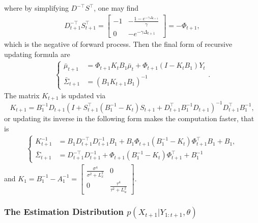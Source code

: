 where by simplifying $D^{-\top}S^\top$, one may find 
\begin{align*}
D_{t+1}^{-\top}S_{t+1}^\top = \begin{bmatrix}
-1 & -\frac{1-e^{-\gamma \Delta_{t+1}}}{\gamma} \\ 0 & - e^{-\gamma \Delta_{t+1}}
\end{bmatrix} = -\Phi_{t+1},
\end{align*}
which is the negative of forward process. Then the final form of recursive updating formula are 
\begin{align}
\begin{cases}
\bar{\mu}_{t+1}&=\Phi_{t+1} K_tB_1\bar{\mu}_t + \Phi_{t+1} (I-K_tB_1)Y_t\\
\bar{\Sigma}_{t+1}&=\left( B_1K_{t+1}B_1  \right)^{-1}
\end{cases}.
\end{align}
The matrix $K_{t+1}$ is updated via 
\begin{equation}\label{recursiveKp1}
K_{t+1} =B_1^{-1}D_{t+1} (I+ S_{t+1}^\top (B_1^{-1} - K_t)  S_{t+1} +D_{t+1}^\top B_1^{-1}D_{t+1}  )^{-1}  D_{t+1}^\top B_1^{-1},
\end{equation}
or updating its inverse in the following form makes the computation faster, that is 
\begin{align*}
\begin{cases}
K_{t+1}^{-1} &= B_1D_{t+1}^{-\top}D_{t+1}^{-1}B_1 + B_1\Phi_{t+1} (B_1^{-1} - K_t) \Phi_{t+1}^\top B_1+ B_1,\\
\bar{\Sigma}_{t+1}&= D_{t+1}^{-\top}D_{t+1}^{-1}+ \Phi_{t+1} (B_1^{-1} - K_t) \Phi_{t+1}^\top + B_1^{-1}
\end{cases}
\end{align*}
and $K_1 =B_1^{-1} - A_1^{-1} = \begin{bmatrix}
\frac{\sigma^4}{\sigma^2 +L_x^2} & 0 \\ 0 &\frac{\tau^4}{\tau^2 +L_u^2}
\end{bmatrix} $.

\subsubsection{The Estimation Distribution $p(X_{t+1}| Y_{1:t+1},\theta)$}


